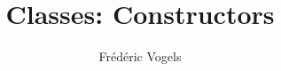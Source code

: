 
\usetikzlibrary{shadows,shapes.multipart}

\title{Classes: Constructors}
\author{Fr\'ed\'eric Vogels}

\newcommand{\highlightbox}[2][]{
  \draw[opacity=.75,ultra thick,red,#1] ($ (#2.south west) + (-.1,-.1) $) rectangle ($ (#2.north east) + (.1,.1) $)
}




\begin{frame}
  \titlepage
\end{frame}









